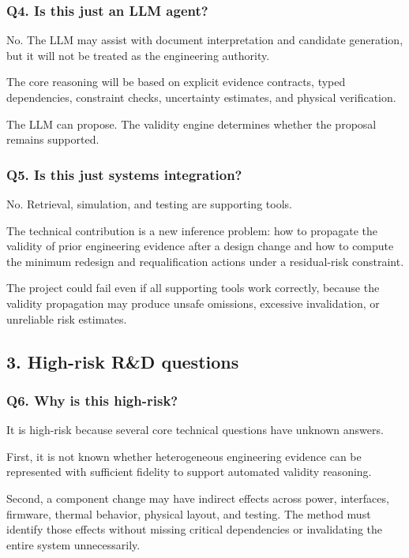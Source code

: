 \documentclass[12pt,letterpaper]{article}
\begin{document}
\subsubsection{Q4. Is this just an LLM agent?}

No. The LLM may assist with document interpretation and candidate generation, but it will not be treated as the engineering authority.

The core reasoning will be based on explicit evidence contracts, typed dependencies, constraint checks, uncertainty estimates, and physical verification.

The LLM can propose. The validity engine determines whether the proposal remains supported.

\subsubsection{Q5. Is this just systems integration?}

No. Retrieval, simulation, and testing are supporting tools.

The technical contribution is a new inference problem: how to propagate the validity of prior engineering evidence after a design change and how to compute the minimum redesign and requalification actions under a residual-risk constraint.

The project could fail even if all supporting tools work correctly, because the validity propagation may produce unsafe omissions, excessive invalidation, or unreliable risk estimates.

\subsection{3. High-risk R\&D questions}
\subsubsection{Q6. Why is this high-risk?}

It is high-risk because several core technical questions have unknown answers.

First, it is not known whether heterogeneous engineering evidence can be represented with sufficient fidelity to support automated validity reasoning.

Second, a component change may have indirect effects across power, interfaces, firmware, thermal behavior, physical layout, and testing. The method must identify those effects without missing critical dependencies or invalidating the entire system unnecessarily.
\end{document}
